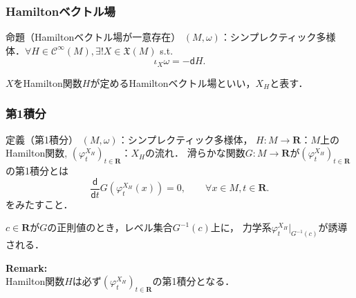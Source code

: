 \documentclass[11pt,%
dvipdfmx,cjk]{beamer}
\newcommand{\rr}{\mathbf{R}}
\begin{document}
\begin{frame}
\frametitle{Hamiltonベクトル場}
\begin{block}{命題（Hamiltonベクトル場が一意存在）}
\((M, \omega)\)：シンプレクティック多様体．\(\forall H \in \mathcal{C}^{\infty}(M),
\exists! X \in \mathfrak{X}(M)\) s.t. 
\[
\iota_{X}\omega = - \mathsf{d}H.
\]
\end{block}
\(X\)をHamilton関数\(H\)が定めるHamiltonベクトル場といい，\(X_{H}\)と表す．
\end{frame}

\begin{frame}
\frametitle{第1積分}
\begin{block}{定義（第1積分）}
\((M, \omega)\)：シンプレクティック多様体，
\(H\colon M \to \mathbf{R}\)：\(M\)上のHamilton関数, 
\((\varphi_{t}^{X_{H}})_{t \in \mathbf{R}}\)：$X_{H}$の流れ．
滑らかな関数\(G: M \to \rr\)が\((\varphi_{t}^{X_{H}})_{t \in \mathbf{R}}\)の第1積分とは
\[
\frac{\mathsf{d}}{\mathsf{d}t}G(\varphi_{t}^{X_{H}}(x)) = 0, 
\qquad \forall x \in M, t \in \mathbf{R}.
\]
をみたすこと．
\end{block}
\(c \in \mathbf{R}\)が\(G\)の正則値のとき，レベル集合\(G^{-1}(c)\)上に，
力学系\(\varphi_{t}^{X_{H}}|_{G^{-1}(c)}\)が誘導される． %

\textbf{Remark:}\\
Hamilton関数\(H\)は必ず\((\varphi_{t}^{X_{H}})_{t \in \mathbf{R}}\)の第1積分となる．
\end{frame}

\end{document}
